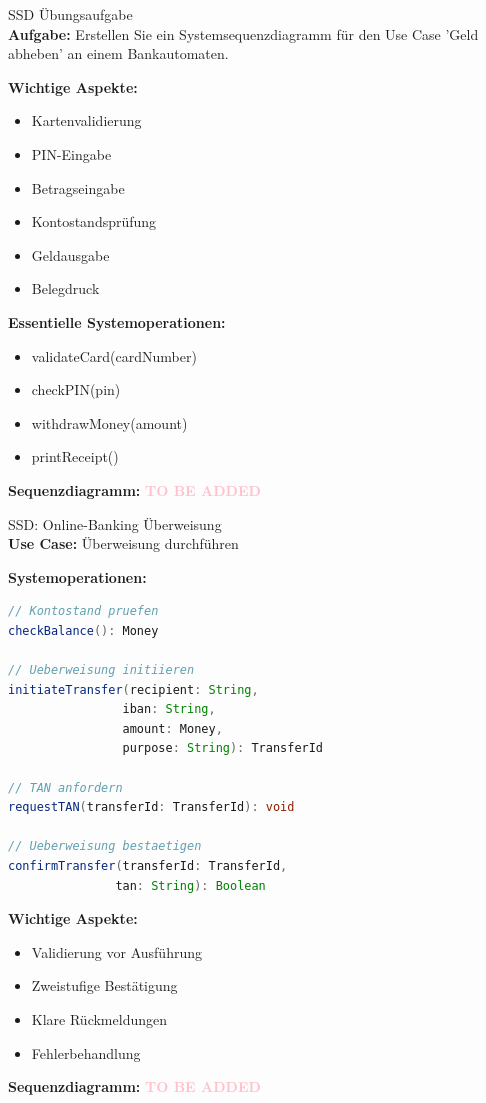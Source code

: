 \columnbreak

\begin{example2}{SSD Übungsaufgabe}\\
\textbf{Aufgabe:} Erstellen Sie ein Systemsequenzdiagramm für den Use Case 'Geld abheben' an einem Bankautomaten.

\textbf{Wichtige Aspekte:}
\begin{itemize}
    \item Kartenvalidierung
    \item PIN-Eingabe
    \item Betragseingabe
    \item Kontostandsprüfung
    \item Geldausgabe
    \item Belegdruck
\end{itemize}

\textbf{Essentielle Systemoperationen:}
\begin{itemize}
    \item validateCard(cardNumber)
    \item checkPIN(pin)
    \item withdrawMoney(amount)
    \item printReceipt()
\end{itemize}

\textbf{Sequenzdiagramm:} %
\textcolor{pink}{\textbf{TO BE ADDED}}
\end{example2}

\columnbreak

\begin{example2}{SSD: Online-Banking Überweisung}\\
\textbf{Use Case:} Überweisung durchführen

\textbf{Systemoperationen:}
\begin{lstlisting}[language=Java, style=base]
// Kontostand pruefen
checkBalance(): Money

// Ueberweisung initiieren
initiateTransfer(recipient: String, 
                iban: String, 
                amount: Money, 
                purpose: String): TransferId

// TAN anfordern
requestTAN(transferId: TransferId): void

// Ueberweisung bestaetigen
confirmTransfer(transferId: TransferId, 
               tan: String): Boolean
\end{lstlisting}

\textbf{Wichtige Aspekte:}
\begin{itemize}
    \item Validierung vor Ausführung
    \item Zweistufige Bestätigung
    \item Klare Rückmeldungen
    \item Fehlerbehandlung
\end{itemize}

\textbf{Sequenzdiagramm:} %
\textcolor{pink}{\textbf{TO BE ADDED}}
\end{example2}

